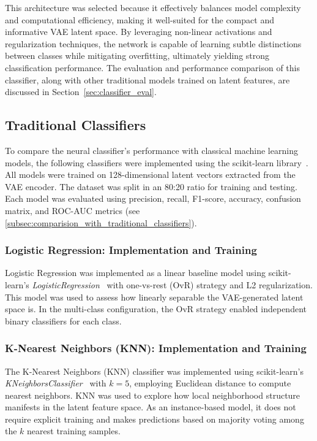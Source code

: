 This architecture was selected because it effectively balances model complexity and computational efficiency, making it well-suited for the compact and informative VAE latent space. By leveraging non-linear activations and regularization techniques, the network is capable of learning subtle distinctions between classes while mitigating overfitting, ultimately yielding strong classification performance. The evaluation and performance comparison of this classifier, along with other traditional models trained on latent features, are discussed in Section~\ref{sec:classifier_eval}.




\subsection{Traditional Classifiers}
\label{subsec:traditional_classifiers}

To compare the neural classifier's performance with classical machine learning models, the following classifiers were implemented using the scikit-learn library~\cite{scikit-learn}. All models were trained on 128-dimensional latent vectors extracted from the VAE encoder. The dataset was split in an 80:20 ratio for training and testing. Each model was evaluated using precision, recall, F1-score, accuracy, confusion matrix, and ROC-AUC metrics (see \cref{subsec:comparision_with_traditional_classifiers}).

\subsubsection{Logistic Regression: Implementation and Training}
\label{subsubsec:logistic_regression}
Logistic Regression was implemented as a linear baseline model using scikit-learn’s \textit{LogisticRegression}~\cite{scikit-learn} with one-vs-rest (OvR) strategy and L2 regularization. This model was used to assess how linearly separable the VAE-generated latent space is. In the multi-class configuration, the OvR strategy enabled independent binary classifiers for each class.

\subsubsection{K-Nearest Neighbors (KNN): Implementation and Training}
\label{subsubsec:knn}
The K-Nearest Neighbors (KNN) classifier was implemented using scikit-learn’s \textit{KNeighborsClassifier}~\cite{Cover1967} with $k=5$, employing Euclidean distance to compute nearest neighbors. KNN was used to explore how local neighborhood structure manifests in the latent feature space. As an instance-based model, it does not require explicit training and makes predictions based on majority voting among the $k$ nearest training samples.

